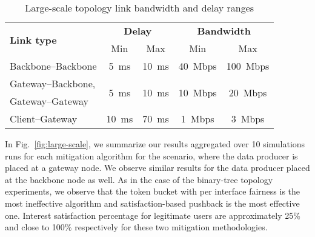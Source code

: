 \begin{table}[htbp]
\centering
\caption{Large-scale topology link bandwidth and delay ranges}
\vspace{-0.3cm}
\label{tab:large-scale}
\begin{tabular}{|l||c|c||c|c|}
  \hline
  \multirow{2}{*}{\bf Link type} &  \multicolumn{2}{|c||}{\bf Delay} &  \multicolumn{2}{|c|}{\bf Bandwidth} \tabularnewline
  \cline{2-5}
                        &  Min & Max                       &  Min & Max \tabularnewline
  \hline \hline
  Backbone--Backbone    & 5~ms & 10~ms   & 40~Mbps & 100~Mbps \tabularnewline
  \hline
  Gateway--Backbone,    & \multirow{2}{*}{5~ms} & \multirow{2}{*}{10~ms}   
                        & \multirow{2}{*}{10~Mbps} & \multirow{2}{*}{20~Mbps} \tabularnewline
  Gateway--Gateway      & & & & \\
  \hline
  Client--Gateway       & 10~ms & 70~ms   & 1~Mbps  & 3~Mbps \\
  \hline
\end{tabular}
\vspace{-0.3cm}
\end{table}




In Fig.~\ref{fig:large-scale}, we summarize our results aggregated over 10 simulations runs for each mitigation algorithm for the scenario, where the data producer is placed at a gateway node. We observe similar results for the data producer placed at the backbone node as well. As in the case of the binary-tree topology experiments, we observe that the token bucket with per interface fairness is the most ineffective algorithm and satisfaction-based pushback is the most effective one.  Interest satisfaction percentage for legitimate users are approximately 25\% and close to 100\% respectively for these two mitigation methodologies.

